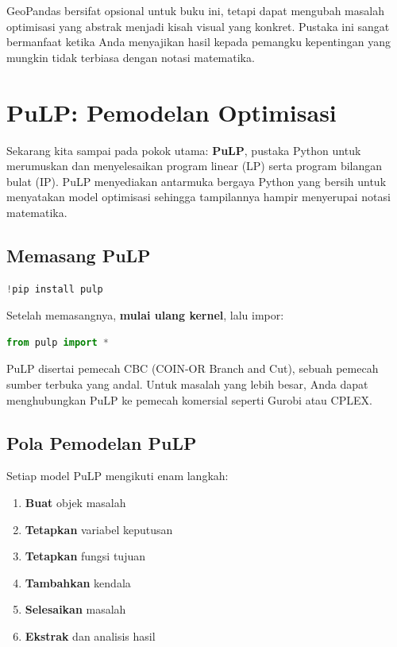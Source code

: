 \begin{info}
GeoPandas bersifat opsional untuk buku ini, tetapi dapat mengubah masalah optimisasi yang abstrak menjadi kisah visual yang konkret. Pustaka ini sangat bermanfaat ketika Anda menyajikan hasil kepada pemangku kepentingan yang mungkin tidak terbiasa dengan notasi matematika.
\end{info}

\section{PuLP: Pemodelan Optimisasi}

Sekarang kita sampai pada pokok utama: \textbf{PuLP}, pustaka Python untuk merumuskan dan menyelesaikan program linear (LP) serta program bilangan bulat (IP). PuLP menyediakan antarmuka bergaya Python yang bersih untuk menyatakan model optimisasi sehingga tampilannya hampir menyerupai notasi matematika.

\subsection{Memasang PuLP}

\begin{lstlisting}[language=Python]
!pip install pulp
\end{lstlisting}

Setelah memasangnya, \textbf{mulai ulang kernel}, lalu impor:

\begin{lstlisting}[language=Python]
from pulp import *
\end{lstlisting}

PuLP disertai pemecah CBC (COIN-OR Branch and Cut), sebuah pemecah sumber terbuka yang andal. Untuk masalah yang lebih besar, Anda dapat menghubungkan PuLP ke pemecah komersial seperti Gurobi atau CPLEX.

\subsection{Pola Pemodelan PuLP}
\label{sec:pulp-pattern}

Setiap model PuLP mengikuti enam langkah:

\begin{enumerate}
\item \textbf{Buat} objek masalah
\item \textbf{Tetapkan} variabel keputusan
\item \textbf{Tetapkan} fungsi tujuan
\item \textbf{Tambahkan} kendala
\item \textbf{Selesaikan} masalah
\item \textbf{Ekstrak} dan analisis hasil
\end{enumerate}

